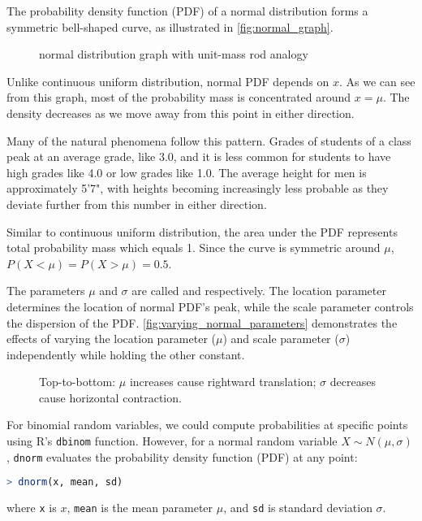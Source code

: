 The probability density function (PDF) of a normal distribution forms a symmetric bell-shaped curve, as illustrated in \autoref{fig:normal_graph}.
\begin{figure}[t]
\begin{center}
\end{center}
\caption{normal distribution graph with unit-mass rod analogy}
\label{fig:normal_graph}
\end{figure}
Unlike continuous uniform distribution, normal PDF depends on \( x \).
As we can see from this graph, most of the probability mass is concentrated around \( x = \mu \).
The density decreases as we move away from this point in either direction.

Many of the natural phenomena follow this pattern.
Grades of students of a class peak at an average grade, like 3.0, and it is less common for students to have high grades like 4.0 or low grades like 1.0.
The average height for men is approximately 5'7",
with heights becoming increasingly less probable as they deviate further from this number in either direction.

Similar to continuous uniform distribution, the area under the PDF represents total probability mass which equals 1.
Since the curve is symmetric around \( \mu \), \( P(X < \mu) = P(X > \mu) = 0.5 \).

The parameters \( \mu \) and \( \sigma \) are called  and  respectively.
The location parameter determines the location of normal PDF's peak, while the scale parameter controls the dispersion of the PDF.
\autoref{fig:varying_normal_parameters} demonstrates the effects of varying the location parameter (\( \mu \)) and scale parameter (\( \sigma \)) independently while holding the other constant.
\begin{figure}[t]
\begin{center}
\end{center}
\caption{Top-to-bottom: \( \mu \) increases cause rightward translation; \( \sigma \) decreases cause horizontal contraction.}
\label{fig:varying_normal_parameters}
\end{figure}
For binomial random variables, we could compute probabilities at specific points using R's \verb|dbinom| function.
However, for a normal random variable \( X \sim N(\mu, \sigma) \),
\verb|dnorm| evaluates the probability density function (PDF) at any point:
\begin{lstlisting}[language=R]
> dnorm(x, mean, sd)
\end{lstlisting}
where \verb|x| is \( x \), \verb|mean| is the mean parameter \( \mu \), and \verb|sd| is standard deviation \( \sigma \).

